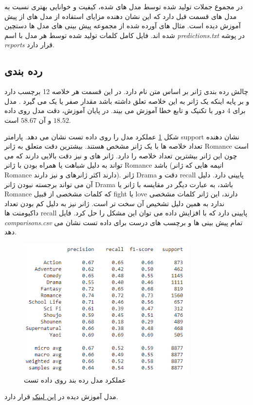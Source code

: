 در مجموع جملات تولید شده توسط مدل های 
شده، کیفیت و خوانایی بهتری نسبت به مدل های قسمت قبل دارد که این نشان دهنده مزایای استفاده از مدل های از پیش آموزش دیده است. مثال های آورده شده از مجموعه پیش بینی های مدل ها دستچین شده اند. فایل کامل کلمات تولید شده توسط هر مدل با اسم 
\textit{predictions.txt}
در پوشه 
\textit{reports}
قرار دارد.


\subsection{رده بندی}

چالش رده بندی ژانر بر اساس متن
نام دارد. در این قسمت هر خلاصه 12 برچسب دارد و بر پایه اینکه یک ژانر به این خلاصه تعلق داشته باشد مقدار صفر یا یک می گیرد \cite{Ref2}. مدل 
 برای 4 دور با تکنیک 
 و تابع خطا 
 آموزش می بیند. در پایان آموزش، دقت مدل روی داده 
 $18.52$
 و
 آن 
 $58.67$
 است.
 
 شکل \ref{fig51} عملکرد مدل را روی داده تست نشان می دهد. پارامتر
 support
 نشان دهنده تعداد خلاصه ها با یک ژانر مشخص هستند. بیشترین دقت متعلق به ژانر
 Romance
 است چون این ژانر بیشترین تعداد خلاصه را دارد. ژانر های 
 و
 نیز دقت بالایی دارند که می تواند به دلیل شباهت یا همراه بودن با ژانر 
 Romance
 باشد (انیمه هایی که ژانر Romance دارند اکثر ژانرهای
 و
 نیز دارند). ژانر 
 Drama
 دقت و recall
 پایینی دارد. دلیل آن می تواند برجسته نبودن ژانر
 Drama
 باشد، به عبارت دیگر در مقایسه با ژانر 
 یا
 Romance
 که کلمات مشخصی از قبیل 
 fight 
 یا
 love
 دارند، این ژانر کلمات مشخصی ندارد به همین دلیل تشخیص آن سخت تر است. ژانر
 نیز به دلیل کم بودن تعداد داکیومنت ها 
recall
پایینی دارد که با افزایش داده می توان این مشکل را حل کرد. فایل 
\textit{comparisons.csv}
تمام پیش بینی ها و برچسب های درست برای داده تست نشان می دهد.
 
 
 \begin{figure}[H]
 	\centering
 	
 	\includegraphics[width=0.8\textwidth,height=0.8\textheight,keepaspectratio]{images/5-1}
 	\caption{عملکرد مدل رده بند روی داده تست}
 	\label{fig51}
 	
 \end{figure} 

مدل آموزش دیده در 
\href{https://drive.google.com/file/d/1-CdPLFg798VMqX6XFSbg8Ioju_ynQ5q2/view?usp=sharing}{این لینک}
قرار دارد.
 

